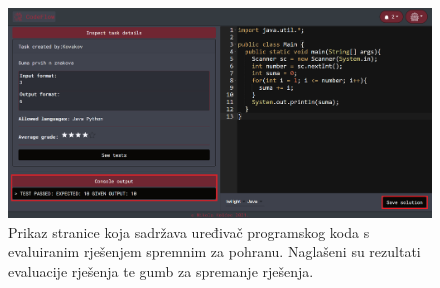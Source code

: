 \documentclass[times, utf8, zavrsni, numeric]{fer}
\begin{document}
		\begin{figure}[H]
			\centering
			\includegraphics[width=\linewidth]{pictures/koristenje/RijeseniZadatak.png}
			\caption{Prikaz stranice koja sadržava uređivač programskog koda s evaluiranim rješenjem spremnim za pohranu. Naglašeni su rezultati evaluacije rješenja te gumb za spremanje rješenja.}
			\label{fig:rjeseno}
		\end{figure}
	
\end{document}
